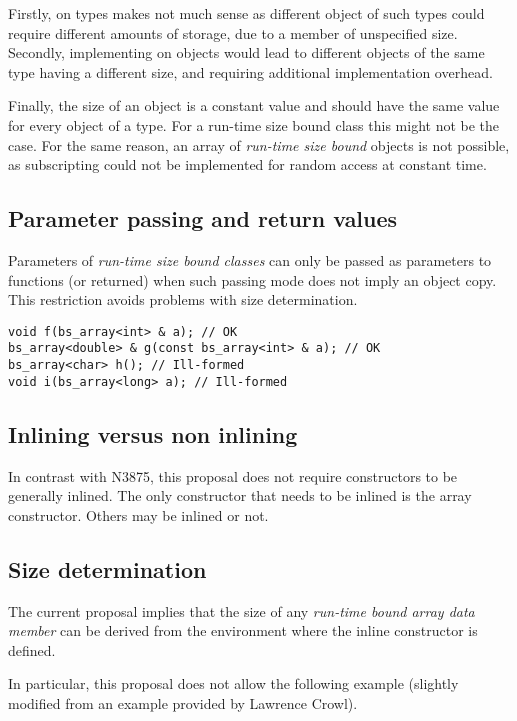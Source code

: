 Firstly, on types  makes not much sense as different object of such types could require
different amounts of storage, due to a member of unspecified size. Secondly, implementing 
on objects would lead to different objects of the same type having a different size, and requiring
additional implementation overhead.

Finally, the size of an object is a constant value and should have the same value for every object of
a type. For a run-time size bound class this might not be the case. For the same reason, an array of
\emph{run-time size bound} objects is not possible, as subscripting could not be implemented for
random access at constant time.

\subsection{Parameter passing and return values}

Parameters of \emph{run-time size bound classes} can only be passed as parameters to functions (or returned)
when such passing mode does not imply an object copy. This restriction avoids problems with size determination.

\begin{lstlisting}
void f(bs_array<int> & a); // OK
bs_array<double> & g(const bs_array<int> & a); // OK
bs_array<char> h(); // Ill-formed
void i(bs_array<long> a); // Ill-formed
\end{lstlisting}

\subsection{Inlining versus non inlining}

In contrast with N3875, this proposal does not require constructors to be
generally inlined. The only constructor that needs to be inlined is the
array constructor. Others may be inlined or not.

\subsection{Size determination}
\label{sec:inline-size-det}

The current proposal implies that the size of any \emph{run-time bound array
data member} can be derived from the environment where the inline constructor is
defined.

In particular, this proposal does not allow the following example (slightly
modified from an example provided by Lawrence Crowl).


